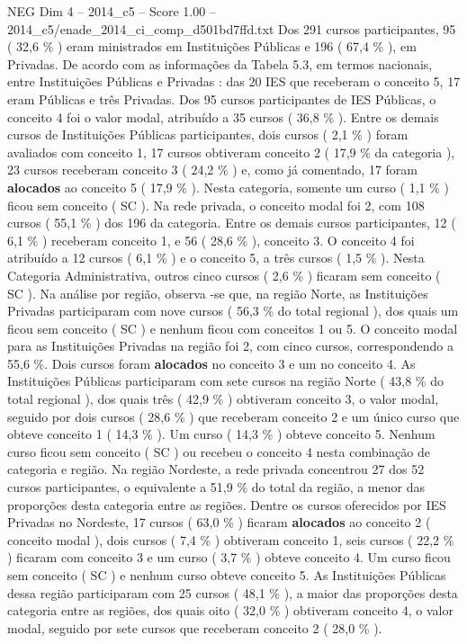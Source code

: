 \begin{textsample}{NEG Dim 4 – 2014\_c5 – Score 1.00 – 2014\_c5/enade\_2014\_ci\_comp\_d501bd7ffd.txt}
Dos 291 cursos participantes, 95 ( 32,6 \% ) eram ministrados em Instituições Públicas e 196 ( 67,4 \% ), em Privadas.
De acordo com as informações da Tabela 5.3, em termos nacionais, entre Instituições Públicas e Privadas : das 20 IES que receberam o conceito 5, 17 eram Públicas e três Privadas.
Dos 95 cursos participantes de IES Públicas, o conceito 4 foi o valor modal, atribuído a 35 cursos ( 36,8 \% ).
Entre os demais cursos de Instituições Públicas participantes, dois cursos ( 2,1 \% ) foram avaliados com conceito 1, 17 cursos obtiveram conceito 2 ( 17,9 \% da categoria ), 23 cursos receberam conceito 3 ( 24,2 \% ) e, como já comentado, 17 foram \textbf{alocados} ao conceito 5 ( 17,9 \% ).
Nesta categoria, somente um curso ( 1,1 \% ) ficou sem conceito ( SC ).
Na rede privada, o conceito modal foi 2, com 108 cursos ( 55,1 \% ) dos 196 da categoria.
Entre os demais cursos participantes, 12 ( 6,1 \% ) receberam conceito 1, e 56 ( 28,6 \% ), conceito 3.
O conceito 4 foi atribuído a 12 cursos ( 6,1 \% ) e o conceito 5, a três cursos ( 1,5 \% ).
Nesta Categoria Administrativa, outros cinco cursos ( 2,6 \% ) ficaram sem conceito ( SC ).
Na análise por região, observa -se que, na região Norte, as Instituições Privadas participaram com nove cursos ( 56,3 \% do total regional ), dos quais um ficou sem conceito ( SC ) e nenhum ficou com conceitos 1 ou 5.
O conceito modal para as Instituições Privadas na região foi 2, com cinco cursos, correspondendo a 55,6 \%.
Dois cursos foram \textbf{alocados} no conceito 3 e um no conceito 4.
As Instituições Públicas participaram com sete cursos na região Norte ( 43,8 \% do total regional ), dos quais três ( 42,9 \% ) obtiveram conceito 3, o valor modal, seguido por dois cursos ( 28,6 \% ) que receberam conceito 2 e um único curso que obteve conceito 1 ( 14,3 \% ).
Um curso ( 14,3 \% ) obteve conceito 5.
Nenhum curso ficou sem conceito ( SC ) ou recebeu o conceito 4 nesta combinação de categoria e região.
Na região Nordeste, a rede privada concentrou 27 dos 52 cursos participantes, o equivalente a 51,9 \% do total da região, a menor das proporções desta categoria entre as regiões.
Dentre os cursos oferecidos por IES Privadas no Nordeste, 17 cursos ( 63,0 \% ) ficaram \textbf{alocados} ao conceito 2 ( conceito modal ), dois cursos ( 7,4 \% ) obtiveram conceito 1, seis cursos ( 22,2 \% ) ficaram com conceito 3 e um curso ( 3,7 \% ) obteve conceito 4.
Um curso ficou sem conceito ( SC ) e nenhum curso obteve conceito 5.
As Instituições Públicas dessa região participaram com 25 cursos ( 48,1 \% ), a maior das proporções desta categoria entre as regiões, dos quais oito ( 32,0 \% ) obtiveram conceito 4, o valor modal, seguido por sete cursos que receberam conceito 2 ( 28,0 \% ).

\end{textsample}
